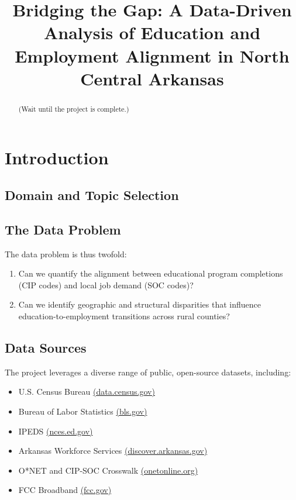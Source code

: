 \documentclass[12pt]{article}
\title{Bridging the Gap: A Data-Driven Analysis of Education and Employment Alignment in North Central Arkansas}
\author{}
\date{}
\begin{document}
\maketitle

\begin{abstract}
(Wait until the project is complete.)
\end{abstract}

\section{Introduction}

\subsection{Domain and Topic Selection}
 

\subsection{The Data Problem}

The data problem is thus twofold:
\begin{enumerate}[label=\arabic*.]
  \item Can we quantify the alignment between educational program completions (CIP codes) and local job demand (SOC codes)?
  \item Can we identify geographic and structural disparities that influence education-to-employment transitions across rural counties?
\end{enumerate}

\subsection{Data Sources}
The project leverages a diverse range of public, open-source datasets, including:
\begin{itemize}
  \item U.S. Census Bureau \href{https://data.census.gov}{(data.census.gov)}
  \item Bureau of Labor Statistics \href{https://www.bls.gov/data/}{(bls.gov)}
  \item IPEDS \href{https://nces.ed.gov/ipeds/}{(nces.ed.gov)}
  \item Arkansas Workforce Services \href{https://www.discover.arkansas.gov}{(discover.arkansas.gov)}
  \item O*NET and CIP-SOC Crosswalk \href{https://www.onetonline.org}{(onetonline.org)}
  \item FCC Broadband \href{https://broadbandmap.fcc.gov}{(fcc.gov)}
\end{itemize}
\end{document}

